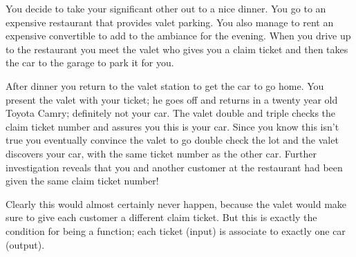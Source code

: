 \documentclass{ximeraXloud}
\begin{document}
    \begin{explanation}
        You decide to take your significant other out to a nice dinner. You go to an expensive restaurant that provides valet parking. You also manage to rent an expensive convertible to add to the ambiance for the evening. When you drive up to the restaurant you meet the valet who gives you a claim ticket and then takes the car to the garage to park it for you.
    
        After dinner you return to the valet station to get the car to go home. You present the valet with your ticket; he goes off and returns in a twenty year old Toyota Camry; definitely not your car. The valet double and triple checks the claim ticket number and assures you this is your car. Since you know this isn't true you eventually convince the valet to go double check the lot and the valet discovers your car, with the same ticket number as the other car. Further investigation reveals that you and another customer at the restaurant had been given the same claim ticket number!
    \end{explanation}
        
    Clearly this would almost certainly never happen, because the valet would make sure to give each customer a different claim ticket. But this is exactly the condition for being a function; each ticket (input) is associate to exactly one car (output).
    
\end{document}
